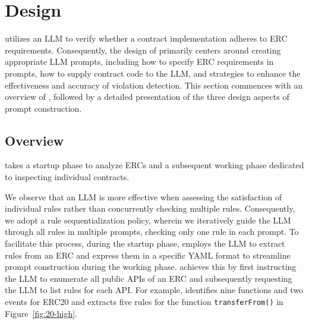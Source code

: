 \section{\Tool{} Design }

\Tool{} utilizes an LLM to verify whether a contract implementation 
adheres to ERC requirements. 
Consequently, the design of \Tool{} primarily centers around 
creating appropriate LLM prompts, including how to specify ERC requirements 
in prompts, how to supply contract code to the LLM, 
and strategies to enhance the effectiveness and accuracy of violation detection.
This section commences with an overview of \Tool{}, 
followed by a detailed presentation of the three design aspects of prompt construction. 


\subsection{Overview}

\Tool{} takes a startup phase to analyze ERCs and a subsequent working phase dedicated to inspecting individual contracts.

We observe that an LLM is more effective when assessing the 
satisfaction of individual rules rather than concurrently checking multiple rules. 
Consequently, we adopt a rule sequentialization policy, 
wherein we iteratively guide the LLM through all rules in multiple prompts, 
checking only one rule in each prompt. 
To facilitate this process, during the startup phase, \Tool{} employs 
the LLM to extract rules from an ERC and express them in a specific YAML format to 
streamline prompt construction during the working phase. 
\Tool{} achieves this by first instructing the LLM to enumerate all public 
APIs of an ERC and subsequently requesting the LLM 
to list rules for each API. For example, \Tool{} identifies nine functions and 
two events for ERC20 and extracts five rules for 
the function \texttt{transferFrom()} in Figure~\ref{fig:20-high}.



